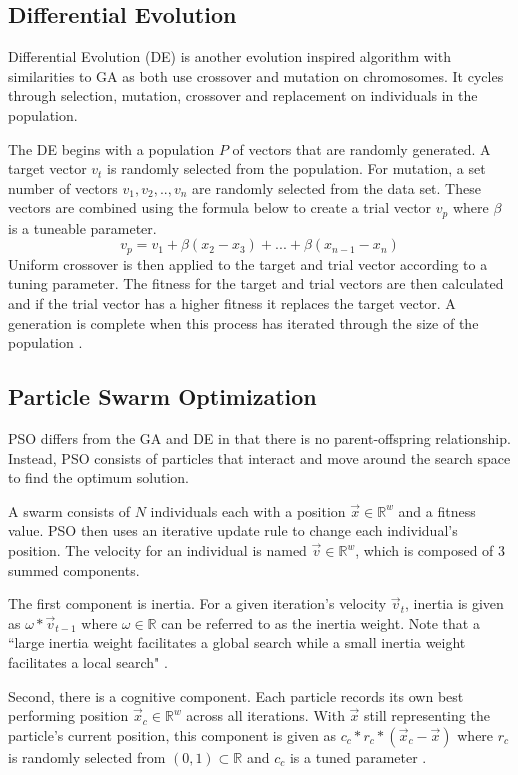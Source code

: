 \documentclass[twoside,11pt]{article}
\newcommand{\Rw}{\mathbb{R}^w }
\begin{document}
\subsection{Differential Evolution}
Differential Evolution (DE) is another evolution inspired algorithm with  similarities to GA as both use crossover and mutation on chromosomes. It cycles through selection, mutation, crossover and replacement on individuals in the population.

The DE begins with a population $P$ of vectors that are randomly generated. A target vector $v_t$ is randomly selected from the population. For mutation, a set number of vectors $v_1, v_2,.., v_n$ are randomly selected from the data set. These vectors are combined using the formula below to create a trial vector $v_p$ where $\beta$ is a tuneable parameter\cite{price2006differential}. $$v_p = v_1 + \beta(x_2 - x_3) + ... + \beta(x_{n-1} - x_n)$$
Uniform crossover is then applied to the target and trial vector according to a tuning parameter. The fitness for the target and trial vectors are then calculated and if the trial vector has a higher fitness it replaces the target vector. A generation is complete when this process has iterated through the size of the population \cite{price2006differential}.

\subsection{Particle Swarm Optimization}

	PSO differs from the GA and DE in that there is no parent-offspring relationship. Instead, PSO consists of particles that interact and move around the search space to find the optimum solution.

	A swarm consists of $N$ individuals each with a position $\vec{x} \in \Rw$ and a fitness value.
	PSO then uses an iterative update rule to change each individual's position. The velocity for an individual is named $\vec{v} \in \Rw$, which is composed of 3 summed components.

	The first component is inertia. For a given iteration's velocity $\vec{v}_t$, inertia is given as $\omega * \vec{v}_{t-1}$ where $\omega \in \mathbb{R}$ can be referred to as the inertia weight. Note that a ``large inertia weight facilitates a global search while a small inertia weight facilitates a local search" \citep{empirical-pso}.

	Second, there is a cognitive component.
	Each particle records its own best performing position $\vec{x}_c \in \Rw$ across all iterations.
	With $\vec{x}$ still representing the particle's current position, this component is given as $c_c * r_c * (\vec{x}_c - \vec{x})$ where $r_c$ is randomly selected from $(0,1) \subset \mathbb{R}$ and $c_c$ is a tuned parameter \citep{og-pso}.
\end{document}
